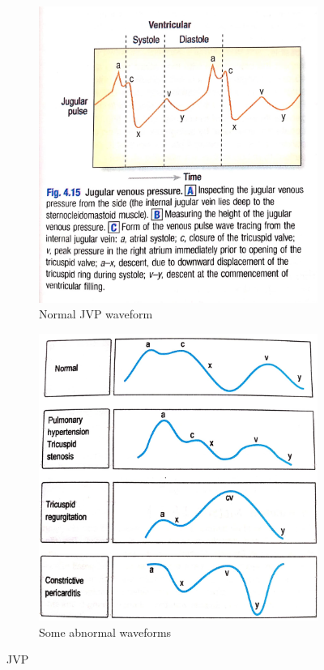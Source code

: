 \documentclass[
  12pt,
]{memoir}
\begin{document}
\begin{figure}[!h]
    \centering
    \begin{subfigure}{.45\textwidth}
        \includegraphics[width=\textwidth]{../assets/med/jvp2.jpg}
        \caption{Normal JVP waveform}
    \end{subfigure}\hfill
    \begin{subfigure}{.45\textwidth}
        \includegraphics[width=\textwidth]{../assets/med/jvp.jpg}
        \caption{Some abnormal waveforms}
    \end{subfigure}
    \vspace{5mm}
    \caption{JVP}
    \label{fig:jvp}
\end{figure}
\end{document}

